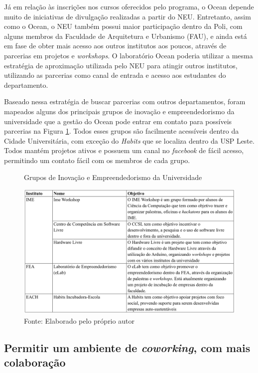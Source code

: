 Já em relação às inscrições nos cursos oferecidos pelo programa, o Ocean depende muito de iniciativas de divulgação realizadas a partir do NEU. Entretanto, assim como o Ocean, o NEU também possui maior participação dentro da Poli, com alguns membros da Faculdade de Arquitetura e Urbanismo (FAU), e ainda está em fase de obter mais acesso aos outros institutos aos poucos, através de parcerias em projetos e \textit{workshops}. O laboratório Ocean poderia utilizar a mesma estratégia de aproximação utilizada pelo NEU para atingir outros institutos, utilizando as parcerias como canal de entrada e acesso aos estudantes do departamento.

Baseado nessa estratégia de buscar parcerias com outros departamentos, foram mapeados alguns dos principais grupos de inovação e empreendedorismo da universidade que a gestão do Ocean pode entrar em contato para possíveis parcerias na Figura \ref{fig:institutosuniversidade}. Todos esses grupos são facilmente acessíveis dentro da Cidade Universitária, com exceção do \textit{Habits} que se localiza dentro da USP Leste. Todos mantém projetos ativos e possuem um canal no \textit{facebook} de fácil acesso, permitindo um contato fácil com os membros de cada grupo.

\begin{figure}[H]
\caption{Grupos de Inovação e Empreendedorismo da Universidade}
\centerline{\includegraphics[scale=0.6]{img/institutosuniversidade}}
\label{fig:institutosuniversidade}
\caption* {Fonte: Elaborado pelo próprio autor}
\end{figure}

\subsection{Permitir um ambiente de \textit{coworking}, com mais colaboração}

